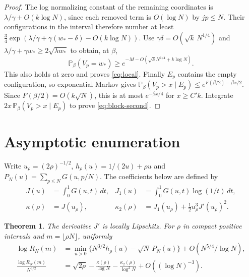 \documentclass[11pt]{amsart}
\newtheorem{theorem}{Theorem}[section]
\theoremstyle{remark}
\newcommand{\Pp}{\mathbb P}
\begin{document}
\begin{proof}
The log normalizing constant of the remaining coordinates is
\(\lambda/\gamma+O(k\log N)\), since each removed term is \(O(\log N)\)
by \(jp\le N\). Their configurations in the interval therefore number
at least \(\tfrac34\exp(\lambda/\gamma+\gamma(w_*-\delta)-O(k\log N))\).
Use \(\gamma\delta=O(\sqrt k\,N^{1/4})\) and
\(\lambda/\gamma+\gamma w_*\ge2\sqrt{\lambda w_*}\) to obtain, at \(\beta\),
\begin{equation}\label{eq:winning-block-lower}
 \Pp_\beta(V_p=w_*)\ge e^{-M-O(\sqrt{k}N^{1/4}+k\log N)} .
\end{equation}
This also holds at zero and proves \eqref{eq:local}.
Finally \(E_p\) contains the empty configuration, so exponential
Markov gives \(\Pp_\beta(V_p>x\mid E_p)\le
e^{F(\beta/2)-\beta x/2}\). Since \(F(\beta/2)=O(k\sqrt N)\),
this is at most \(e^{-\beta x/4}\) for \(x\ge C'k\).
Integrate \(2x\,\Pp_\beta(V_p>x\mid E_p)\) to prove \eqref{eq:block-second}.
\end{proof}


\section{Asymptotic enumeration}\label{sec:enumeration}

Write \(u_\rho=(2\rho)^{-1/2}\), \(h_\rho(u)=1/(2u)+\rho u\) and
\(P_N(u)=\sum_{p\le N}G(u,p/N)\). The coefficients below are defined by
\begin{equation}\label{eq:kappas}
\begin{aligned}
 J(u)&=\int_0^1G(u,t)\,dt,& J_1(u)&=\int_0^1G(u,t)\log(1/t)\,dt,\\
 \kappa(\rho)&=J(u_\rho),&
 \kappa_2(\rho)&=J_1(u_\rho)+\tfrac12 u_\rho^3 J'(u_\rho)^2 .
\end{aligned}
\end{equation}

\begin{theorem}\label{thm:enumeration}
The derivative \(J'\) is locally Lipschitz. For \(\rho\) in compact positive
intervals and \(m=\lfloor\rho N\rfloor\), uniformly
\begin{align}
 \log R_N(m)&=\min_{u>0}\{N^{3/2}h_\rho(u)-\sqrt N\, P_N(u)\}
                  +O(N^{5/4}/\log N),\label{eq:prime-variational}\\
 \frac{\log R_N(m)}{N^{3/2}}&=\sqrt{2\rho}
        -\frac{\kappa(\rho)}{\log N}-\frac{\kappa_2(\rho)}{\log^2 N}
        +O((\log N)^{-3}).\label{eq:three-terms}
\end{align}
\end{theorem}
\end{document}
